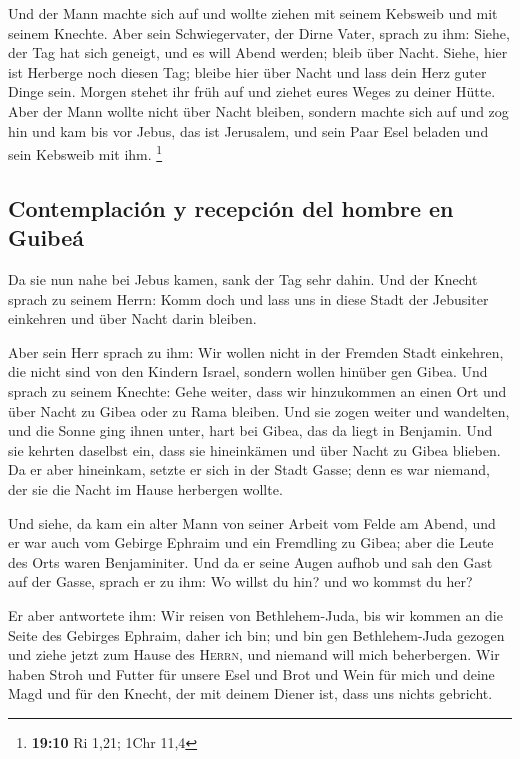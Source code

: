  Und der Mann machte sich auf und wollte ziehen mit seinem
Kebsweib und mit seinem Knechte. Aber sein Schwiegervater, der Dirne
Vater, sprach zu ihm: Siehe, der Tag hat sich geneigt, und es will Abend
werden; bleib über Nacht. Siehe, hier ist Herberge noch diesen Tag;
bleibe hier über Nacht und lass dein Herz guter Dinge sein. Morgen
stehet ihr früh auf und ziehet eures Weges zu deiner Hütte.
 Aber der Mann wollte nicht über Nacht bleiben, sondern
machte sich auf und zog hin und kam bis vor Jebus, das ist Jerusalem,
und sein Paar Esel beladen und sein Kebsweib mit ihm. \footnote{\textbf{19:10}
  Ri 1,21; 1Chr 11,4}

\hypertarget{contemplaciuxf3n-y-recepciuxf3n-del-hombre-en-guibeuxe1}{%
\subsection{Contemplación y recepción del hombre en
Guibeá}\label{contemplaciuxf3n-y-recepciuxf3n-del-hombre-en-guibeuxe1}}

 Da sie nun nahe bei Jebus kamen, sank der Tag sehr
dahin. Und der Knecht sprach zu seinem Herrn: Komm doch und lass uns in
diese Stadt der Jebusiter einkehren und über Nacht darin bleiben.

 Aber sein Herr sprach zu ihm: Wir wollen nicht in der
Fremden Stadt einkehren, die nicht sind von den Kindern Israel, sondern
wollen hinüber gen Gibea.  Und sprach zu seinem Knechte:
Gehe weiter, dass wir hinzukommen an einen Ort und über Nacht zu Gibea
oder zu Rama bleiben.  Und sie zogen weiter und
wandelten, und die Sonne ging ihnen unter, hart bei Gibea, das da liegt
in Benjamin.  Und sie kehrten daselbst ein, dass sie
hineinkämen und über Nacht zu Gibea blieben. Da er aber hineinkam,
setzte er sich in der Stadt Gasse; denn es war niemand, der sie die
Nacht im Hause herbergen wollte.

 Und siehe, da kam ein alter Mann von seiner Arbeit vom
Felde am Abend, und er war auch vom Gebirge Ephraim und ein Fremdling zu
Gibea; aber die Leute des Orts waren Benjaminiter.  Und
da er seine Augen aufhob und sah den Gast auf der Gasse, sprach er zu
ihm: Wo willst du hin? und wo kommst du her?

 Er aber antwortete ihm: Wir reisen von Bethlehem-Juda,
bis wir kommen an die Seite des Gebirges Ephraim, daher ich bin; und bin
gen Bethlehem-Juda gezogen und ziehe jetzt zum Hause des \textsc{Herrn},
und niemand will mich beherbergen.  Wir haben Stroh und
Futter für unsere Esel und Brot und Wein für mich und deine Magd und für
den Knecht, der mit deinem Diener ist, dass uns nichts gebricht.


